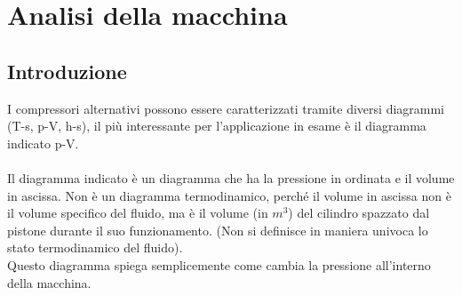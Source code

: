 \section{Analisi della macchina}
\subsection{Introduzione}
I compressori alternativi possono essere caratterizzati tramite diversi diagrammi (T-s, p-V, h-s), il più interessante per l'applicazione in esame è il diagramma indicato p-V. \\
\\
Il diagramma indicato è un diagramma che ha la pressione in ordinata e il volume in ascissa.
Non è un diagramma termodinamico, perché il volume in ascissa non è il volume specifico del fluido, ma è il volume (in $m^3$) del cilindro spazzato dal pistone durante il suo funzionamento. (Non si definisce in maniera univoca lo stato termodinamico del fluido).\\
Questo diagramma spiega semplicemente come cambia la pressione all’interno della macchina. 
